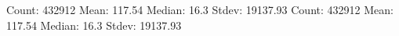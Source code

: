 Count: 432912
Mean: 117.54
Median: 16.3
Stdev: 19137.93
Count: 432912
Mean: 117.54
Median: 16.3
Stdev: 19137.93
